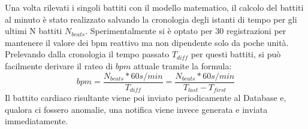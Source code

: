 Una volta rilevati i singoli battiti con il modello matematico, il calcolo del battiti al minuto è stato realizzato salvando la cronologia degli istanti di tempo per gli ultimi N battiti $N_{beats}$. Sperimentalmente si è optato per 30 registrazioni per mantenere il valore dei bpm reattivo ma non dipendente solo da poche unità. Prelevando dalla cronologia il tempo passato $T_{diff}$ per questi battiti, si può facilmente derivare il rateo di $bpm$ attuale tramite la formula: 
\begin{equation}
bpm = \frac{ N_{beats}*60 s/min }{T_{diff}} = \frac{ N_{beats}*60 s/min }{T_{last}-T_{first}} 
\end{equation}
Il battito cardiaco risultante viene poi inviato periodicamente al Database e, qualora ci fossero anomalie, una notifica viene invece generata e inviata immediatamente.



